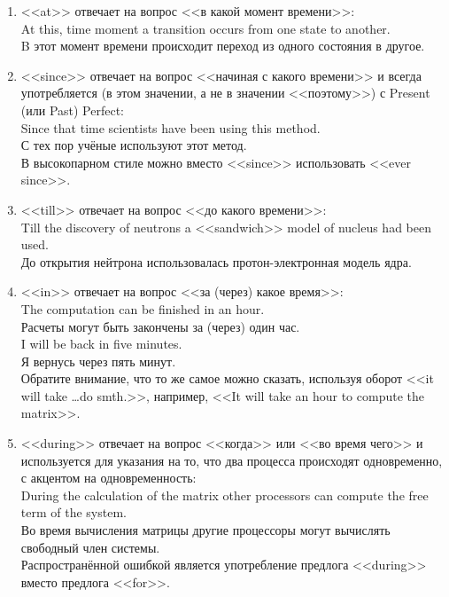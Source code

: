 \documentclass[a5paper, 10pt, twoside, numbers=enddot]{scrartcl}
\begin{document}
\begin{enumerate}
\begin{enumerate}
    \item <<at>> отвечает на вопрос <<в какой момент времени>>:\\ [4pt]
    \textsf{At this, time moment a transition occurs from one state to another.\\
    B этот момент времени происходит переход из одного состояния в другое.}
    
    \item <<since>> отвечает на вопрос <<начиная с какого времени>> и всегда употребляется (в этом значении, а не в значении <<поэтому>>) с Present (или Past) Perfect:\\ [4pt]
    \textsf{Since that time scientists have been using this method.\\
    С тех пор учёные используют этот метод.\\ [4pt]}
    В высокопарном стиле можно вместо <<since>> использовать <<ever since>>.
    
    \item <<till>> отвечает на вопрос <<до какого времени>>:\\ [4pt]
    \textsf{Till the discovery of neutrons a <<sandwich>> model of nucleus had been used.\\
    До открытия нейтрона использовалась протон-электронная модель ядра.}
    
    \item <<in>> отвечает на вопрос <<за (через) какое время>>:\\ [4pt]
    \textsf{The computation can be finished in an hour.\\
    Расчеты могут быть закончены за (через) один час.\\ [4pt]
    I will  be back in five minutes.\\
    Я вернусь через пять минут.\\ [4pt]}
    Обратите внимание, что то же самое можно сказать, используя оборот <<it will take \ldots do smth.>>, например, <<It will take an hour to compute the matrix>>.
    
    \item <<during>> отвечает на вопрос <<когда>> или <<во время чего>> и используется для указания на то, что два процесса происходят одновременно, с акцентом на одновременность:\\ [4pt]
    \textsf{During the calculation of the matrix other processors can compute the free term of the system.\\
    Во время вычисления матрицы другие  процессоры могут вычислять свободный член системы.\\ [4pt]}
    Распространённой ошибкой является употребление предлога <<during>> вместо предлога <<for>>.
    

\end{enumerate}
\end{enumerate}
\end{document}
